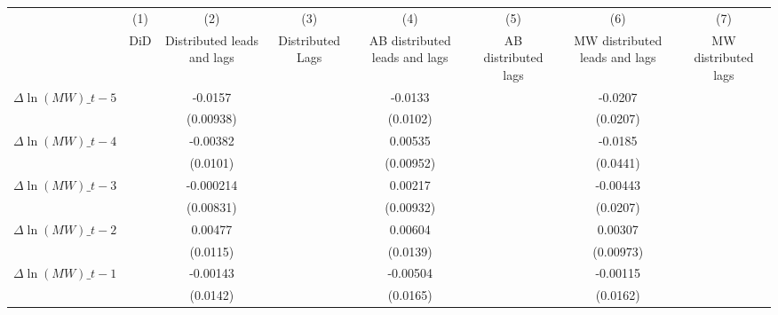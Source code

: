 {
\def\sym#1{\ifmmode^{#1}\else\(^{#1}\)\fi}
\begin{tabular}{l*{7}{c}}
\hline\hline
          &\multicolumn{1}{c}{(1)}&\multicolumn{1}{c}{(2)}&\multicolumn{1}{c}{(3)}&\multicolumn{1}{c}{(4)}&\multicolumn{1}{c}{(5)}&\multicolumn{1}{c}{(6)}&\multicolumn{1}{c}{(7)}\\
          &\multicolumn{1}{c}{DiD}&\multicolumn{1}{c}{Distributed leads and lags}&\multicolumn{1}{c}{Distributed Lags}&\multicolumn{1}{c}{AB distributed leads and lags}&\multicolumn{1}{c}{AB distributed lags}&\multicolumn{1}{c}{MW distributed leads and lags}&\multicolumn{1}{c}{MW distributed lags}\\
\hline
$\Delta \ln(MW)\_{t-5}$&                  &  -0.0157         &                  &  -0.0133         &                  &  -0.0207         &                  \\
          &                  &(0.00938)         &                  & (0.0102)         &                  & (0.0207)         &                  \\
[1em]
$\Delta \ln(MW)\_{t-4}$&                  & -0.00382         &                  &  0.00535         &                  &  -0.0185         &                  \\
          &                  & (0.0101)         &                  &(0.00952)         &                  & (0.0441)         &                  \\
[1em]
$\Delta \ln(MW)\_{t-3}$&                  &-0.000214         &                  &  0.00217         &                  & -0.00443         &                  \\
          &                  &(0.00831)         &                  &(0.00932)         &                  & (0.0207)         &                  \\
[1em]
$\Delta \ln(MW)\_{t-2}$&                  &  0.00477         &                  &  0.00604         &                  &  0.00307         &                  \\
          &                  & (0.0115)         &                  & (0.0139)         &                  &(0.00973)         &                  \\
[1em]
$\Delta \ln(MW)\_{t-1}$&                  & -0.00143         &                  & -0.00504         &                  & -0.00115         &                  \\
          &                  & (0.0142)         &                  & (0.0165)         &                  & (0.0162)         &                  \\

\end{tabular}}
